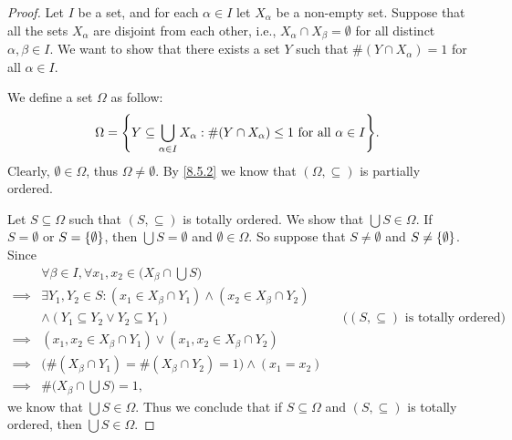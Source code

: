 \begin{proof}
  Let \(I\) be a set, and for each \(\alpha \in I\) let \(X_{\alpha}\) be a non-empty set.
  Suppose that all the sets \(X_{\alpha}\) are disjoint from each other, i.e., \(X_{\alpha} \cap X_{\beta} = \emptyset\) for all distinct \(\alpha, \beta \in I\).
  We want to show that there exists a set \(Y\) such that \(\#(Y \cap X_{\alpha}) = 1\) for all \(\alpha \in I\).

  We define a set \(\Omega\) as follow:
  \[
    \Omega = \set{Y \subseteq \bigcup_{\alpha \in I} X_{\alpha} : \#(Y \cap X_{\alpha}) \leq 1 \text{ for all } \alpha \in I}.
  \]
  Clearly, \(\emptyset \in \Omega\), thus \(\Omega \neq \emptyset\).
  By \cref{8.5.2} we know that \((\Omega, \subseteq)\) is partially ordered.

  Let \(S \subseteq \Omega\) such that \((S, \subseteq)\) is totally ordered.
  We show that \(\bigcup S \in \Omega\).
  If \(S = \emptyset\) or \(S = \left\lbrace\emptyset\right\rbrace\), then \(\bigcup S = \emptyset\) and \(\emptyset \in \Omega\).
  So suppose that \(S \neq \emptyset\) and \(S \neq \left\lbrace\emptyset\right\rbrace\).
  Since
  \begin{align*}
             & \forall \beta \in I, \forall x_1, x_2 \in \Big(X_{\beta} \cap \bigcup S\Big)                                                                 \\
    \implies & \exists Y_1, Y_2 \in S : (x_1 \in X_{\beta} \cap Y_1) \land (x_2 \in X_{\beta} \cap Y_2)                                                     \\
             & \land (Y_1 \subseteq Y_2 \lor Y_2 \subseteq Y_1)                                         &  & \text{(\((S, \subseteq)\) is totally ordered)} \\
    \implies & (x_1, x_2 \in X_{\beta} \cap Y_1) \lor (x_1, x_2 \in X_{\beta} \cap Y_2)                                                                     \\
    \implies & \big(\#(X_{\beta} \cap Y_1) = \#(X_{\beta} \cap Y_2) = 1\big) \land (x_1 = x_2)                                                              \\
    \implies & \#\Big(X_{\beta} \cap \bigcup S\Big) = 1,
  \end{align*}
  we know that \(\bigcup S \in \Omega\).
  Thus we conclude that if \(S \subseteq \Omega\) and \((S, \subseteq)\) is totally ordered, then \(\bigcup S \in \Omega\).


\end{proof}
